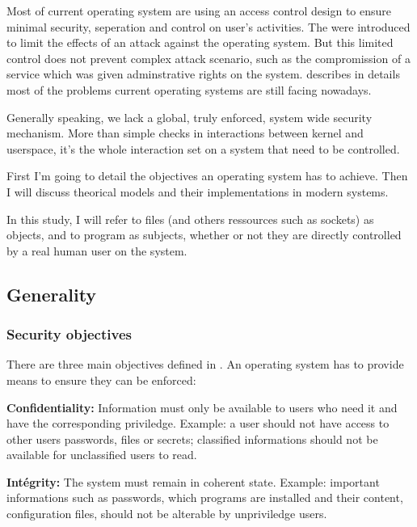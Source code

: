 \documentclass[pdftex,a4paper,titlepage,11pt]{article}
\begin{document}
\smallskip

Most of current operating system are using an access control design to ensure minimal security, seperation and control on user's activities. The were introduced to limit the effects of an attack against the operating system. But this limited control does not prevent complex attack scenario, such as the compromission of a service which was given adminstrative rights on the system. \cite{NSATIOF} describes in details most of the problems current operating systems are still facing nowadays.

\bigskip

Generally speaking, we lack a global, truly enforced, system wide security mechanism. More than simple checks in interactions between kernel and userspace, it's the whole interaction set on a system that need to be controlled.

\bigskip

First I'm going to detail the objectives an operating system has to achieve. Then I will discuss theorical models and their implementations in modern systems.

\bigskip

In this study, I will refer to files (and others ressources such as sockets) as objects, and to program as subjects, whether or not they are directly controlled by a real human user on the system.

\subsection{Generality}

\subsubsection{Security objectives}

There are three main objectives defined in \cite{SECOBJ}. An operating  system has to provide means to ensure they can be enforced:

\bigskip

\textbf{Confidentiality:}
Information must only be available to users who need it and have the corresponding priviledge. Example: a user should not have access to other users passwords, files or secrets; classified informations should not be available for unclassified users to read.

\medskip

\textbf{Intégrity:}
The system must remain in coherent state. Example: important informations such as passwords, which programs are installed and their content, configuration files, should not be alterable by unpriviledge users.
\end{document}
